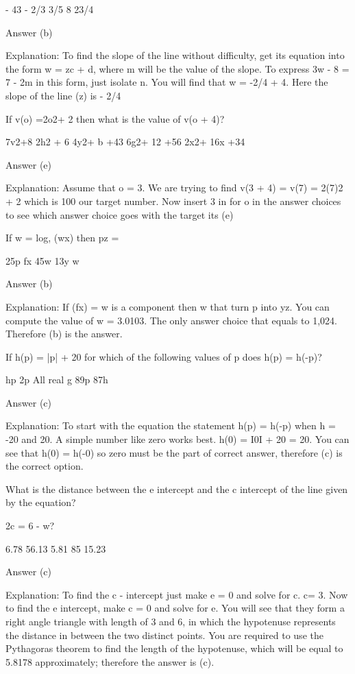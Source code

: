         - 43
        - 2/3
        3/5
        8
        23/4 

    Answer (b)

    Explanation: To find the slope of the line without difficulty, get its equation into the form w = zc + d, where m will be the value of the slope. To express 3w - 8 = 7 - 2m in this form, just isolate n. You will find that w = -2/4 + 4. Here the slope of the line (z) is - 2/4

    If v(o) =2o2+ 2 then what is the value of v(o + 4)?

        7v2+8
        2h2 + 6
        4y2+ b +43
        6g2+ 12 +56
        2x2+ 16x +34 

    Answer (e)

    Explanation: Assume that o = 3. We are trying to find v(3 + 4) = v(7) = 2(7)2 + 2 which is 100 our target number. Now insert 3 in for o in the answer choices to see which answer choice goes with the target its (e)

    If w = log, (wx) then pz =

        25p
        fx
        45w
        13y
        w 

    Answer (b)

    Explanation: If (fx) = w is a component then w that turn p into yz. You can compute the value of w = 3.0103. The only answer choice that equals to 1,024. Therefore (b) is the answer. 



    If h(p) = |p| + 20 for which of the following values of p does h(p) = h(-p)?

        hp
        2p
        All real g
        89p
        87h 

    Answer (c)

    Explanation: To start with the equation the statement h(p) = h(-p) when h = -20 and 20. A simple number like zero works best. h(0) = Ι0Ι + 20 = 20. You can see that h(0) = h(-0) so zero must be the part of correct answer, therefore (c) is the correct option.

    What is the distance between the e intercept and the c intercept of the line given by the equation?

    2c = 6 - w?

        6.78
        56.13
        5.81
        85
        15.23 

    Answer (c)

    Explanation: To find the c - intercept just make e = 0 and solve for c. c= 3. Now to find the e intercept, make c = 0 and solve for e. You will see that they form a right angle triangle with length of 3 and 6, in which the hypotenuse represents the distance in between the two distinct points. You are required to use the Pythagoras theorem to find the length of the hypotenuse, which will be equal to 5.8178 approximately; therefore the answer is (c).

